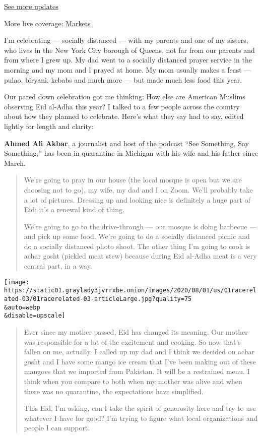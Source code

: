 \href{https://www.nytimes3xbfgragh.onion/2020/08/01/world/coronavirus-covid-19.html?action=click\&pgtype=Article\&state=default\&region=MAIN_CONTENT_1\&context=storylines_live_updates}{See
more updates}

More live coverage:
\href{https://www.nytimes3xbfgragh.onion/live/2020/07/31/business/stock-market-today-coronavirus?action=click\&pgtype=Article\&state=default\&region=MAIN_CONTENT_1\&context=storylines_live_updates}{Markets}

I'm celebrating --- socially distanced --- with my parents and one of my
sisters, who lives in the New York City borough of Queens, not far from
our parents and from where I grew up. My dad went to a socially
distanced prayer service in the morning and my mom and I prayed at home.
My mom usually makes a feast --- pulao, biryani, kebabs and much more
--- but made much less food this year.

Our pared down celebration got me thinking: How else are American
Muslims observing Eid al-Adha this year? I talked to a few people across
the country about how they planned to celebrate. Here's what they say
had to say, edited lightly for length and clarity:

\textbf{Ahmed Ali Akbar}, a journalist and host of the podcast ``See
Something, Say Something,'' has been in quarantine in Michigan with his
wife and his father since March.

\begin{quote}
We're going to pray in our house (the local mosque is open but we are
choosing not to go), my wife, my dad and I on Zoom. We'll probably take
a lot of pictures. Dressing up and looking nice is definitely a huge
part of Eid; it's a renewal kind of thing.

We're going to go to the drive-through --- our mosque is doing barbecue
--- and pick up some food. We're going to do a socially distanced picnic
and do a socially distanced photo shoot. The other thing I'm going to
cook is achar gosht (pickled meat stew) because during Eid al-Adha meat
is a very central part, in a way.
\end{quote}

\texttt{[image: https://static01.graylady3jvrrxbe.onion/images/2020/08/01/us/01racerelated-03/01racerelated-03-articleLarge.jpg?quality=75\\\&auto=webp\\\&disable=upscale]}

\begin{quote}
Ever since my mother passed, Eid has changed its meaning. Our mother was
responsible for a lot of the excitement and cooking. So now that's
fallen on me, actually. I called up my dad and I think we decided on
achar gosht and I have some mango ice cream that I've been making out of
these mangoes that we imported from Pakistan. It will be a restrained
menu. I think when you compare to both when my mother was alive and when
there was no quarantine, the expectations have simplified.

This Eid, I'm asking, can I take the spirit of generosity here and try
to use whatever I have for good? I'm trying to figure what local
organizations and people I can support.
\end{quote}


